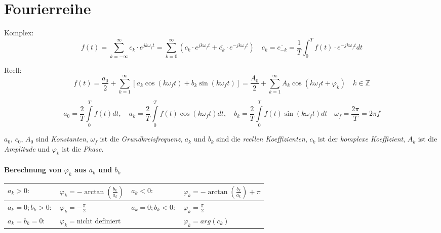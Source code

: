 \section{Fourierreihe}
  	Komplex: $$\boxed{f(t) = \sum\limits_{k = -\infty}^{\infty} c_k \cdot e^{j k
  	\omega_f t}}= \sum\limits_{k = 0}^{\infty} \left(c_k \cdot e^{j k \omega_f
  	t} + \overline{c_k} \cdot e^{-j k \omega_f t}\right) \quad
  	\boxed{c_k=\overline{c_{-k}}=\frac{1}{T}\int_0^T{f(t)\cdot
	e^{-jk\omega_f t}dt}}$$
	
	\vspace{0.5cm}
	
  	Reell: $$\boxed{f(t) = \frac{a_0}{2} + \sum\limits_{k=1}^{\infty} \left[a_k
  	\cos(k \omega_f t) + b_k \sin(k \omega_f t)\right]}=\frac{A_0}{2} +
  	\sum\limits_{k=1}^{\infty} A_k \cos(k \omega_f t + \varphi_k) \quad k\in
  	\mathbb{Z}$$	
	
	$$\boxed{a_0 =
	\frac{2}{T}\int\limits_0^{T} f(t)dt, \quad a_k = \frac{2}{T}\int\limits_0^{T} f(t)\cos(k \omega_f t) dt, \quad b_k =
	\frac{2}{T}\int\limits_0^{T} f(t)\sin(k \omega_f t) dt} \quad
	\boxed{\omega_f=\frac{2 \pi}{T}=2 \pi f}$$
	
	\vspace{0.5cm}

	$a_0$, $c_0$, $A_0$ sind \textit{Konstanten}, $\omega_f$ ist die
	\textit{Grundkreisfrequenz}, $a_k$ und $b_k$ sind die \textit{reellen
	Koeffizienten}, $c_k$ ist der \textit{komplexe Koeffizient}, $A_k$ ist die
	\textit{Amplitude} und $\varphi_k$ ist die \textit{Phase}.\\
	\\

	\textbf{Berechnung von $\varphi_k$ aus $a_k$ und $b_k$}\\
	\begin{tabular}{|p{4cm}p{4cm}|p{3cm}p{3.5cm}|}
		\hline
		$a_k> 0:$ & $\varphi_k = -\arctan(\frac{b_k}{a_k})$ &
		$a_k<0:$ &	$\varphi_k = -\arctan(\frac{b_k}{a_k}) + \pi$\\
		\hline
		$a_k = 0; b_k > 0:$ &	$\varphi_k = -\frac{\pi}{2}$ &
		$a_k = 0; b_k < 0:$ &	$\varphi_k = \frac{\pi}{2}$\\
		\hline
		$a_k = b_k = 0:$ &	$\varphi_k = \text{nicht definiert}$ & & $\varphi_k =
		arg(c_k)$\\
		\hline
	\end{tabular}

